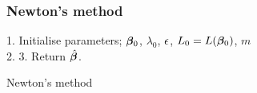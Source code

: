 \begin{appendices}
\subsubsection{Newton's method}

\begin{algorithm}[H]
    1. Initialise parameters; $\bm{\beta}_0$, $\lambda_0$, $\epsilon$, $L_0 = L(\bm{\beta}_0)$, $m$\\
    2.  
    3. Return $\hat{\bm{\beta}}$.
    \caption{Newton's method}
\end{algorithm}

\end{appendices}